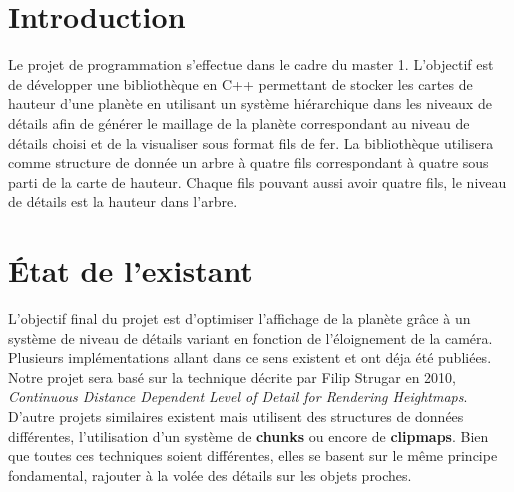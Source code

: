\documentclass[12pt]{report}
\begin{document}



\tableofcontents

\thispagestyle{empty} %


\newpage

\chapter*{Introduction}
\setcounter{chapter}{1}

Le projet de programmation s'effectue dans le cadre du master 1. L'objectif est de développer une bibliothèque en C++ permettant de stocker les cartes de hauteur d'une planète en utilisant un système hiérarchique dans les niveaux de détails afin de générer le maillage de la planète correspondant au niveau de détails choisi et de la visualiser sous format fils de fer.
La bibliothèque utilisera comme structure de donnée un arbre à quatre fils correspondant à quatre sous parti de la carte de hauteur. Chaque fils pouvant aussi avoir quatre fils, le niveau de détails est la hauteur dans l'arbre. 


\newpage

\chapter*{État de l'existant}
\setcounter{chapter}{2}

L'objectif final du projet est d'optimiser l'affichage de la planète grâce à un système de niveau de détails variant en fonction de l'éloignement de la caméra. Plusieurs implémentations allant dans ce sens existent et ont déja été publiées.
Notre projet sera basé sur la technique décrite par Filip Strugar en 2010, \textit{Continuous Distance Dependent Level of Detail for Rendering Heightmaps}.
D'autre projets similaires existent mais utilisent des structures de données différentes, l'utilisation d'un système de \textbf{chunks} ou encore de \textbf{clipmaps}. Bien que toutes ces techniques soient différentes, elles se basent sur le même principe fondamental, rajouter à la volée des détails sur les objets proches.
\end{document}
